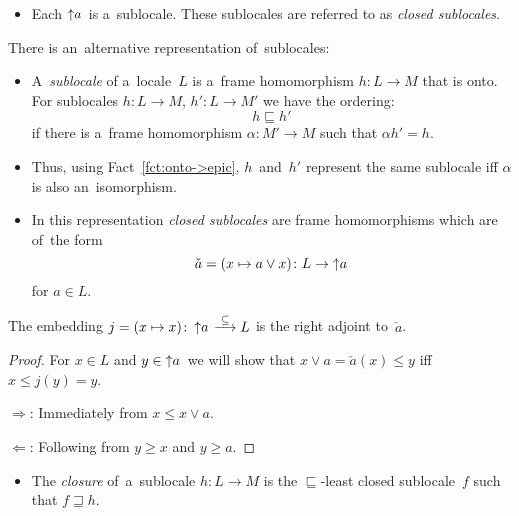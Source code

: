 \begin{itemize}
\item Each $\left\uparrow a\right.$ is a~sublocale.
These sublocales are referred to as \emph{closed sublocales\/}.
\end{itemize}

\begin{rem}
  There is an~alternative representation of~sublocales:
  \begin{itemize}
    \item A~\emph{sublocale\/} of a~locale~$L$ is a~frame homomorphism $h\colon
    L \to M$ that is onto.
    For sublocales $h\colon L \to M$, $h'\colon L \to M'$ we have the ordering:
    \[
      h \sqsubseteq h'
    \]
    if there is a~frame homomorphism $\alpha\colon M' \to M$ such that $\alpha
    h' = h$.

    \item Thus, using Fact~\ref{fct:onto->epic}\thinspace, $h$~and~$h'$
    represent the same sublocale iff $\alpha$ is also an~isomorphism.

    \item
    \label{df:closed-sloc}
    In this representation \emph{closed sublocales\/} are frame homomorphisms
    which are of~the form
    \[
      \check{a} = (x \mapsto a \vee x) \colon L \to \left\uparrow a \right.
    \]
    for $a\in L$.
  \end{itemize}
\end{rem}

\begin{lem} \label{lem:embed-adjoint}
  The embedding $j = (x \mapsto x)\colon \left\uparrow a \right. \embed L$ is
  the right adjoint to~$\check{a}$.
\end{lem}
\begin{proof}
  For $x\in L$ and $y\in \left\uparrow a \right.$ we will show that $x \vee a =
  \check{a}(x) \le y$ iff $x \le j(y) = y$.

  $\Rightarrow$:
  Immediately from $x \le x \vee a$.

  $\Leftarrow$:
  Following from $y \ge x$ and $y \ge a$.
\end{proof}

\begin{itemize}
  \item The \emph{closure\/} of~a~sublocale $h\colon L \to M$ is the
  $\sqsubseteq$-least closed sublocale~$f$ such that $f \sqsupseteq h$.
\end{itemize}

